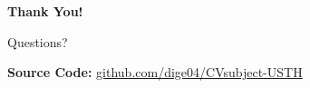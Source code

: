 \documentclass[10pt, aspectratio=169]{beamer}
\begin{document}
\begin{frame}
    \centering
    \vspace{1.5cm}
    {\Huge\textbf{Thank You!}}
    \vspace{1cm}
    
    {\Large Questions?}
    \vspace{1.5cm}
    
    {\small
        \textbf{Source Code:} \href{https://github.com/dige04/CVsubject-USTH}{github.com/dige04/CVsubject-USTH}
    }
\end{frame}
\end{document}
